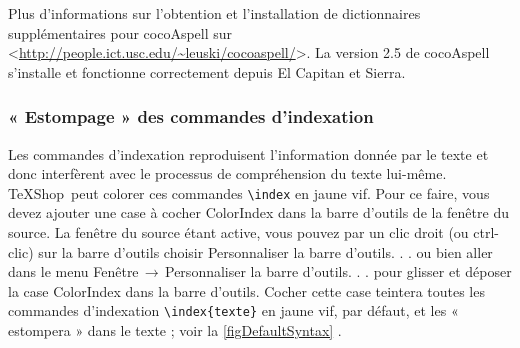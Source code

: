 \documentclass[11pt,french]{article}
\newcommand{\TS}{\textsf{\TeX Shop}}
\newcommand{\cmd}[1]{\textsf{#1}}
\newcommand{\mnu}[1]{\textsf{#1}}
\newcommand{\To}{\,\(\to\)\,}
\begin{document}
Plus d'informations sur l'obtention et l'installation de dictionnaires supplémentaires pour \cmd{cocoAspell} sur <\url{http://people.ict.usc.edu/~leuski/cocoaspell/}>. La version 2.5 de \cmd{cocoAspell} s'installe et fonctionne correctement depuis \cmd{El Capitan} et \cmd{Sierra}.

\subsubsection{« Estompage » des commandes d'indexation}\label{secIndex}


Les commandes d'indexation reproduisent l'information donnée par le texte et donc interfèrent avec le processus de compréhension du texte lui-même. \TS\ peut colorer ces commandes \verb+\index+ en jaune vif. Pour ce faire, vous devez ajouter une case à cocher \cmd{ColorIndex} dans la barre d'outils de la fenêtre du source. La fenêtre du source étant active, vous pouvez par un clic droit (ou \cmd{ctrl-clic}) sur la barre d'outils choisir \mnu{Personnaliser la barre d'outils. . .} ou bien aller dans le menu \mnu{Fenêtre}\To\mnu{Personnaliser la barre d'outils. . .} pour glisser et déposer la case \cmd{ColorIndex} dans la barre d'outils. Cocher cette case teintera toutes les commandes d'indexation \verb+\index{texte}+ en jaune vif, par défaut, et les « estompera » dans le texte ; voir la \cref{figDefaultSyntax} .%

\end{document}

